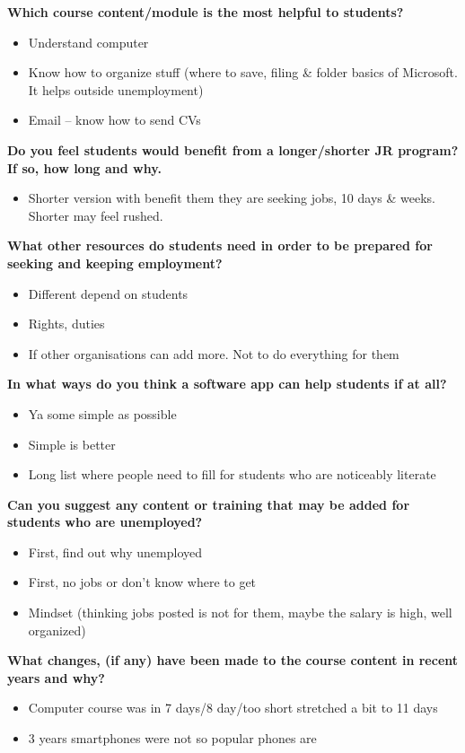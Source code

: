 \noindent\textbf{Which course content/module is the most helpful to students?}
\begin{itemize}
\item Understand computer
\item Know how to organize stuff (where to save, filing \& folder basics of Microsoft. It helps outside unemployment)
\item Email – know how to send CVs
\end{itemize}

\noindent\textbf{Do you feel students would benefit from a longer/shorter JR program? If so, how long and why.}
\begin{itemize}
\item Shorter version with benefit them they are seeking jobs, 10 days \& weeks. Shorter may feel rushed.
\end{itemize}

\noindent\textbf{What other resources do students need in order to be prepared for seeking and keeping employment?}
\begin{itemize}
\item Different depend on students
\item Rights, duties
\item If other organisations can add more. Not to do everything for them
\end{itemize}

\noindent\textbf{In what ways do you think a software app can help students if at all?}
\begin{itemize}
\item Ya some simple as possible
\item Simple is better
\item Long list where people need to fill for students who are noticeably literate
\end{itemize}

\noindent\textbf{Can you suggest any content or training that may be added for students who are unemployed?}
\begin{itemize}
\item First, find out why unemployed
\item First, no jobs or don’t know where to get
\item Mindset (thinking jobs posted is not for them, maybe the salary is high, well organized)
\end{itemize}

\noindent\textbf{What changes, (if any) have been made to the course content in recent years and why?}
\begin{itemize}
\item Computer course was in 7 days/8 day/too short stretched a bit to 11 days
\item 3 years smartphones were not so popular phones are
\end{itemize}

